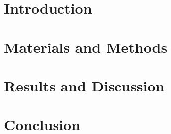 \documentclass[12pt,fleqn]{article}
\theoremstyle{definition}
\theoremstyle{remark}
\theoremstyle{definition}
\begin{document}
\begin{singlespace}
\author{Betsy Cowdery}
\title{}
\date{December 12, 2014}

\maketitle
\end{singlespace}

\begin{abstract}
\end{abstract}

\section{Introduction}
 



\section{Materials and Methods}

\section{Results and Discussion}


\section{Conclusion}


\newpage
\begin{singlespace}
\end{singlespace}
\end{document}

